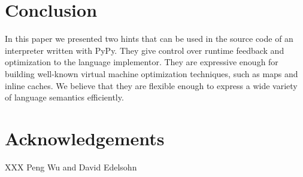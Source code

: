 \documentclass{sigplanconf}
\begin{document}


\section{Conclusion}

In this paper we presented two hints that can be used in the source code of an
interpreter written with PyPy. They give control over runtime feedback and
optimization to the language implementor. They are expressive enough for
building well-known virtual machine optimization techniques, such as maps and
inline caches. We believe that they are flexible enough to express a wide
variety of language semantics efficiently.


\section*{Acknowledgements}

XXX Peng Wu and David Edelsohn



\end{document}

